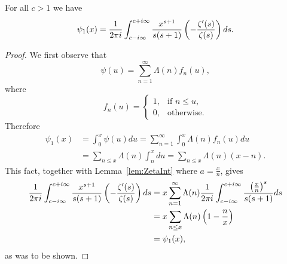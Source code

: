 \begin{proposition}\label{pro:ZetaQuotInt}
	For all $c > 1$ we have
\begin{equation*}
	\psi_1(x) = \frac{1}{2 \pi i} \int _{c - i\infty} ^{c + i \infty} \frac{x^{s + 1}}{s(s + 1)} \left(-\frac{\zeta'(s)}{\zeta(s)}\right) ds.
\end{equation*}
\end{proposition}
\begin{proof}
	We first observe that
\begin{equation*}
	\psi(u) = \sum _{n=1} ^\infty \Lambda(n) f_n(u),
\end{equation*}
	where
\begin{equation*}
	f_n(u) = 
		\left\{
    		\begin{array}{ll}
        		1, &\text{if } n \leq u,\\
        		0, &\text{otherwise}.
        	\end{array}
		\right.
\end{equation*}
	Therefore
\begin{equation*}
\begin{aligned}	
	\psi_1(x)
		&= \int _0 ^x \psi(u) du = \sum _{n = 1} ^\infty \int _0 ^x \Lambda(n) f_n(u) du \\ 
		&= \sum _{n \leq x} \Lambda(n) \int _n ^x du = \sum _{n \leq x} \Lambda(n)(x - n).
\end{aligned}
\end{equation*}
	This fact, together with Lemma~\ref{lem:ZetaInt} where $a = \frac{x}{n}$, gives
\begin{equation*}
\begin{aligned}	
	\frac{1}{2 \pi i} \int _{c - i\infty} ^{c + i \infty} \frac{x^{s + 1}}{s(s + 1)} \left(-\frac{\zeta'(s)}{\zeta(s)}\right) ds 
		&= x \sum _{n = 1} ^\infty \Lambda(n) \frac{1}{2 \pi i} \int _{c - i \infty} ^{c + i \infty} \frac{\left(\frac{x}{n}\right)^s}{s(s + 1)} ds \\
		&= x \sum _{n \leq x} \Lambda(n) \left(1 - \frac{n}{x}\right) \\
		&= \psi_1(x),
\end{aligned}
\end{equation*}
	as was to be shown.
\end{proof}


